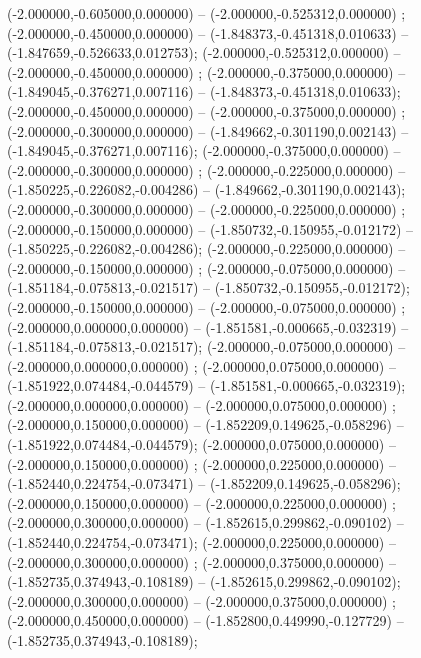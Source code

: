  (-2.000000,-0.605000,0.000000) -- (-2.000000,-0.525312,0.000000) ;
 (-2.000000,-0.450000,0.000000) -- (-1.848373,-0.451318,0.010633) -- (-1.847659,-0.526633,0.012753);
 (-2.000000,-0.525312,0.000000) -- (-2.000000,-0.450000,0.000000) ;
 (-2.000000,-0.375000,0.000000) -- (-1.849045,-0.376271,0.007116) -- (-1.848373,-0.451318,0.010633);
 (-2.000000,-0.450000,0.000000) -- (-2.000000,-0.375000,0.000000) ;
 (-2.000000,-0.300000,0.000000) -- (-1.849662,-0.301190,0.002143) -- (-1.849045,-0.376271,0.007116);
 (-2.000000,-0.375000,0.000000) -- (-2.000000,-0.300000,0.000000) ;
 (-2.000000,-0.225000,0.000000) -- (-1.850225,-0.226082,-0.004286) -- (-1.849662,-0.301190,0.002143);
 (-2.000000,-0.300000,0.000000) -- (-2.000000,-0.225000,0.000000) ;
 (-2.000000,-0.150000,0.000000) -- (-1.850732,-0.150955,-0.012172) -- (-1.850225,-0.226082,-0.004286);
 (-2.000000,-0.225000,0.000000) -- (-2.000000,-0.150000,0.000000) ;
 (-2.000000,-0.075000,0.000000) -- (-1.851184,-0.075813,-0.021517) -- (-1.850732,-0.150955,-0.012172);
 (-2.000000,-0.150000,0.000000) -- (-2.000000,-0.075000,0.000000) ;
 (-2.000000,0.000000,0.000000) -- (-1.851581,-0.000665,-0.032319) -- (-1.851184,-0.075813,-0.021517);
 (-2.000000,-0.075000,0.000000) -- (-2.000000,0.000000,0.000000) ;
 (-2.000000,0.075000,0.000000) -- (-1.851922,0.074484,-0.044579) -- (-1.851581,-0.000665,-0.032319);
 (-2.000000,0.000000,0.000000) -- (-2.000000,0.075000,0.000000) ;
 (-2.000000,0.150000,0.000000) -- (-1.852209,0.149625,-0.058296) -- (-1.851922,0.074484,-0.044579);
 (-2.000000,0.075000,0.000000) -- (-2.000000,0.150000,0.000000) ;
 (-2.000000,0.225000,0.000000) -- (-1.852440,0.224754,-0.073471) -- (-1.852209,0.149625,-0.058296);
 (-2.000000,0.150000,0.000000) -- (-2.000000,0.225000,0.000000) ;
 (-2.000000,0.300000,0.000000) -- (-1.852615,0.299862,-0.090102) -- (-1.852440,0.224754,-0.073471);
 (-2.000000,0.225000,0.000000) -- (-2.000000,0.300000,0.000000) ;
 (-2.000000,0.375000,0.000000) -- (-1.852735,0.374943,-0.108189) -- (-1.852615,0.299862,-0.090102);
 (-2.000000,0.300000,0.000000) -- (-2.000000,0.375000,0.000000) ;
 (-2.000000,0.450000,0.000000) -- (-1.852800,0.449990,-0.127729) -- (-1.852735,0.374943,-0.108189);
